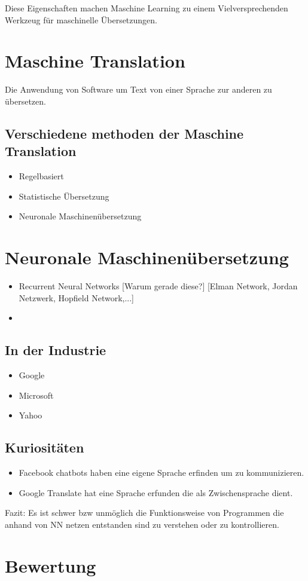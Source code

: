 \documentclass{thesisclass}
\begin{document}
Diese Eigenschaften machen Maschine Learning zu einem Vielversprechenden Werkzeug für maschinelle Übersetzungen.
\section{Maschine Translation}
Die Anwendung von Software um Text von einer Sprache zur anderen zu übersetzen.
\subsection{Verschiedene methoden der Maschine Translation}
\begin{itemize}
	\item Regelbasiert
	\item Statistische Übersetzung
	\item Neuronale Maschinenübersetzung
\end{itemize}
\newpage
\section{Neuronale Maschinenübersetzung}
\begin{itemize}
	\item Recurrent Neural Networks
		[Warum gerade diese?]
		[Elman Network, Jordan Netzwerk, Hopfield Network,...]
	\item 
\end{itemize}
\subsection{In der Industrie}
\begin{itemize}
	\item Google
	\item Microsoft
	\item Yahoo
\end{itemize}
\subsection{Kuriositäten}
\begin{itemize}
	\item Facebook chatbots haben eine eigene Sprache erfinden um zu kommunizieren.
	\item Google Translate hat eine Sprache erfunden die als Zwischensprache dient.
\end{itemize}
Fazit: Es ist schwer bzw unmöglich die Funktionsweise von Programmen die anhand von NN netzen entstanden sind zu verstehen oder zu kontrollieren.
\section{Bewertung}
\end{document}
